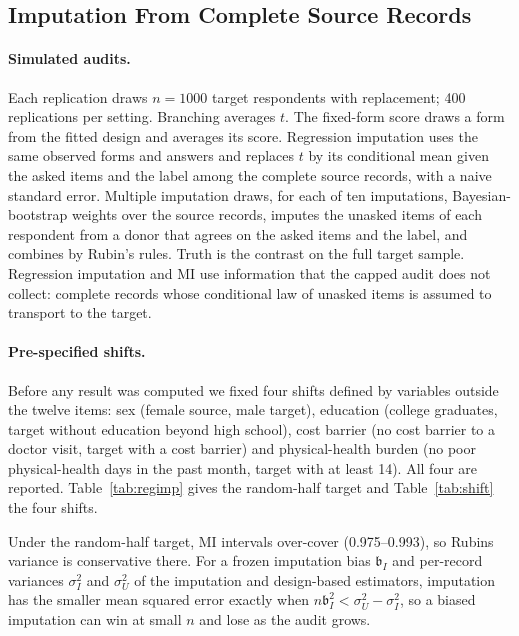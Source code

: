 \subsection{Imputation From Complete Source Records}\label{app:regimp}\label{app:shift}
\paragraph{Simulated audits.}
Each replication draws $n=1000$ target respondents with replacement; 400 replications per setting. Branching averages $t$. The fixed-form score draws a form from the fitted design and averages its score. Regression imputation uses the same observed forms and answers and replaces $t$ by its conditional mean given the asked items and the label among the complete source records, with a naive standard error. Multiple imputation draws, for each of ten imputations, Bayesian-bootstrap weights over the source records, imputes the unasked items of each respondent from a donor that agrees on the asked items and the label, and combines by Rubin's rules. Truth is the contrast on the full target sample. Regression imputation and MI use information that the capped audit does not collect: complete records whose conditional law of unasked items is assumed to transport to the target.

\paragraph{Pre-specified shifts.}
Before any result was computed we fixed four shifts defined by variables outside the twelve items: sex (female source, male target), education (college graduates, target without education beyond high school), cost barrier (no cost barrier to a doctor visit, target with a cost barrier) and physical-health burden (no poor physical-health days in the past month, target with at least 14). All four are reported. Table~\ref{tab:regimp} gives the random-half target and Table~\ref{tab:shift} the four shifts.



Under the random-half target, MI intervals over-cover (0.975--0.993), so Rubin\textquotesingle s variance is conservative there. For a frozen imputation bias $\mathfrak b_I$ and per-record variances $\sigma_I^2$ and $\sigma_U^2$ of the imputation and design-based estimators, imputation has the smaller mean squared error exactly when $n\mathfrak b_I^2<\sigma_U^2-\sigma_I^2$, so a biased imputation can win at small $n$ and lose as the audit grows.

